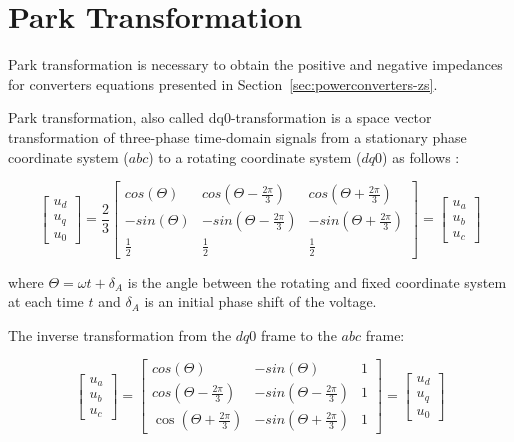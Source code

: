 \documentclass[12pt]{report} %
\begin{document}
\section{Park Transformation} \label{sec:park}
Park transformation is necessary to obtain the positive and negative impedances for converters equations presented in Section~\ref{sec:powerconverters-zs}.

Park transformation, also called dq0-transformation is a space vector transformation of three-phase time-domain signals from a stationary phase coordinate system ($abc$) to a rotating coordinate system ($dq0$) as follows \cite{park1929}:

\begin{equation}
\begin{bmatrix}
u_d\\ 
u_q\\
u_0
\end{bmatrix}=
\frac{2}{3}\begin{bmatrix}
cos(\Theta) & cos(\Theta-\frac{2\pi}{3}) & cos(\Theta+\frac{2\pi}{3})\\ 
-sin(\Theta) & -sin(\Theta-\frac{2\pi}{3}) & -sin(\Theta+\frac{2\pi}{3})\\ 
\frac{1}{2} & \frac{1}{2} & \frac{1}{2}
\end{bmatrix}=
\begin{bmatrix}
u_a\\ 
u_b\\
u_c
\end{bmatrix}
\end{equation}

where $\Theta=\omega t+\delta_A$ is the angle between the rotating and fixed coordinate system at each time $t$ and $\delta_A$ is an initial phase shift of the voltage.

The inverse transformation from the $dq0$ frame to the $abc$ frame:

\begin{equation}
\begin{bmatrix}
u_a\\ 
u_b\\
u_c
\end{bmatrix}=
\begin{bmatrix}
cos(\Theta) & -sin(\Theta) & 1\\ 
cos(\Theta-\frac{2\pi}{3}) & -sin(\Theta-\frac{2\pi}{3}) & 1\\ 
\cos(\Theta+\frac{2\pi}{3}) & -sin(\Theta+\frac{2\pi}{3}) & 1
\end{bmatrix}=
\begin{bmatrix}
u_d\\ 
u_q\\
u_0
\end{bmatrix}
\end{equation}
\end{document}
